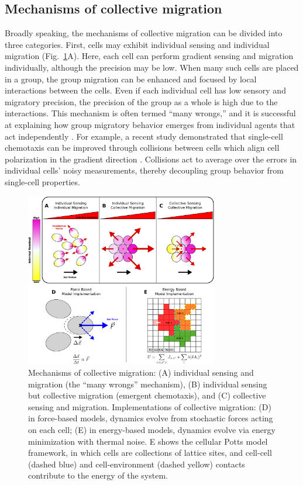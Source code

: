 \subsection{Mechanisms of collective migration}

Broadly speaking, the mechanisms of collective migration can be divided into three categories. First, cells may exhibit individual sensing and individual migration (Fig.\ \ref{models}A). Here, each cell can perform gradient sensing and migration individually, although the precision may be low. When many such cells are placed in a group, the group migration can be enhanced and focused by local interactions between the cells. Even if each individual cell has low sensory and migratory precision, the precision of the group as a whole is high due to the interactions. This mechanism is often termed ``many wrongs,'' and it is successful at explaining how group migratory behavior emerges from individual agents that act independently \cite{simons2004many}. For example, a recent study demonstrated that single-cell chemotaxis can be improved through collisions between cells which align cell polarization in the gradient direction \cite{coburn2013tactile}. Collisions act to average over the errors in individual cells' noisy measurements, thereby decoupling group behavior from single-cell properties.



\begin{figure}[tb]
    \centering
        \includegraphics[width=0.75\textwidth]{../fig/ch1_fig3.pdf}
    \caption{Mechanisms of collective migration: (A) individual sensing and migration (the ``many wrongs'' mechanism), (B) individual sensing but collective migration (emergent chemotaxis), and (C) collective sensing and migration. Implementations of collective migration: (D) in force-based models, dynamics evolve from stochastic forces acting on each cell; (E) in energy-based models, dynamics evolve via energy minimization with thermal noise. E shows the cellular Potts model framework, in which cells are collections of lattice sites, and cell-cell (dashed blue) and cell-environment (dashed yellow) contacts contribute to the energy of the system.}
\label{models}
\end{figure}




